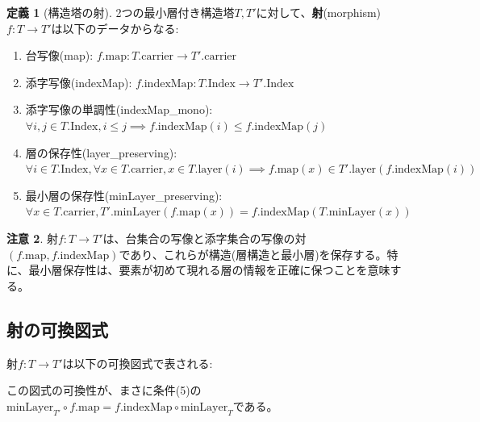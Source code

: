 \documentclass[a4paper,12pt]{article}
\theoremstyle{definition}
\newtheorem{definition}{定義}[section]
\newtheorem{remark}[definition]{注意}
\begin{document}
\begin{definition}[構造塔の射]\label{def:hom}
2つの最小層付き構造塔$T, T'$に対して、\textbf{射}(morphism) $f : T \to T'$は以下のデータからなる:
\begin{enumerate}
\item 台写像(map): $f.\text{map} : T.\text{carrier} \to T'.\text{carrier}$
\item 添字写像(indexMap): $f.\text{indexMap} : T.\text{Index} \to T'.\text{Index}$
\item 添字写像の単調性(indexMap\_mono): \\
$\forall i, j \in T.\text{Index}, i \leq j \implies f.\text{indexMap}(i) \leq f.\text{indexMap}(j)$
\item 層の保存性(layer\_preserving): \\
$\forall i \in T.\text{Index}, \forall x \in T.\text{carrier}, x \in T.\text{layer}(i) \implies f.\text{map}(x) \in T'.\text{layer}(f.\text{indexMap}(i))$
\item 最小層の保存性(minLayer\_preserving): \\
$\forall x \in T.\text{carrier}, T'.\text{minLayer}(f.\text{map}(x)) = f.\text{indexMap}(T.\text{minLayer}(x))$
\end{enumerate}
\end{definition}

\begin{remark}
射$f : T \to T'$は、台集合の写像と添字集合の写像の対$(f.\text{map}, f.\text{indexMap})$であり、これらが構造(層構造と最小層)を保存する。特に、最小層保存性は、要素が初めて現れる層の情報を正確に保つことを意味する。
\end{remark}

\subsection{射の可換図式}

射$f : T \to T'$は以下の可換図式で表される:

\begin{center}
\end{center}

この図式の可換性が、まさに条件(5)の$\text{minLayer}_{T'} \circ f.\text{map} = f.\text{indexMap} \circ \text{minLayer}_T$である。
\end{document}
